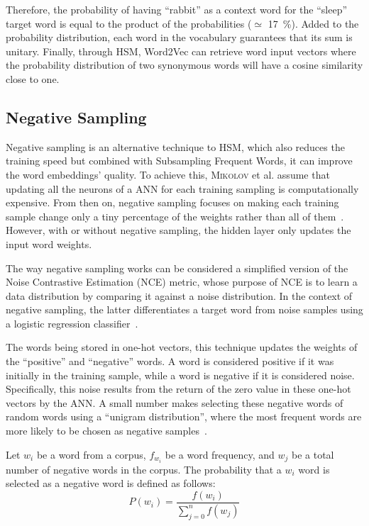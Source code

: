 Therefore, the probability of having ``rabbit'' as a context word for the
``sleep'' target word is equal to the product of the probabilities ($\simeq$
\SI{17}{\percent}). Added to the probability distribution, each word in the
vocabulary guarantees that its sum is unitary. Finally, through HSM, Word2Vec
can retrieve word input vectors where the probability distribution of two
synonymous words will have a cosine similarity close to one.

\subsection{Negative Sampling}
\label{subsec:w2v:ns}

Negative sampling is an alternative technique to HSM, which also reduces the
training speed but combined with Subsampling Frequent Words, it can improve the
word embeddings' quality. To achieve this, \textsc{Mikolov} et al. assume that
updating all the neurons of a ANN for each training sampling is computationally
expensive. From then on, negative sampling focuses on making each training
sample change only a tiny percentage of the weights rather than all of
them~\citep{mccormick}. However, with or without negative sampling, the hidden
layer only updates the input word weights.

The way negative sampling works can be considered a simplified version of the
Noise Contrastive Estimation (NCE) metric, whose purpose of NCE is to learn a
data distribution by comparing it against a noise distribution. In the context
of negative sampling, the latter differentiates a target word from noise samples
using a logistic regression classifier~\citep{DBLP:journals/jmlr/GutmannH10}.

The words being stored in one-hot vectors, this technique updates the weights of
the ``positive'' and ``negative'' words. A word is considered positive if it was
initially in the training sample, while a word is negative if it is considered
noise. Specifically, this noise results from the return of the zero value in
these one-hot vectors by the ANN. A small number makes selecting these negative
words of random words using a ``unigram distribution'', where the most frequent
words are more likely to be chosen as negative samples~\citep{mccormick}.

Let $w_i$ be a word from a corpus, $f_{w_i}$ be a word frequency, and $w_j$ be a
total number of negative words in the corpus. The probability that a $w_i$ word
is selected as a negative word is defined as follows:
\begin{equation} P(w_i) = \frac{f(w_i)}{\sum_{j=0}^nf(w_j)}
  \label{eq:w2v:ns:selection:intro}
\end{equation}

